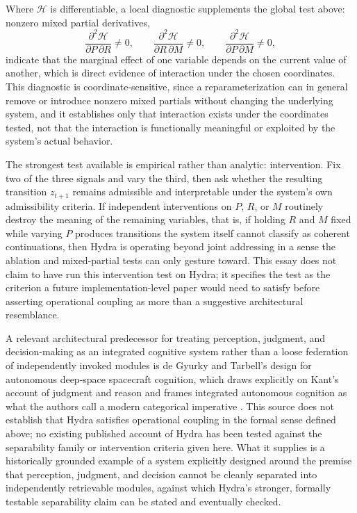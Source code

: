 \documentclass[11pt]{article}
\begin{document}
Where $\mathcal{H}$ is differentiable, a local diagnostic supplements the global test above: nonzero mixed partial derivatives,
\[
\frac{\partial^2 \mathcal{H}}{\partial P\, \partial R} \neq 0, \qquad
\frac{\partial^2 \mathcal{H}}{\partial R\, \partial M} \neq 0, \qquad
\frac{\partial^2 \mathcal{H}}{\partial P\, \partial M} \neq 0,
\]
indicate that the marginal effect of one variable depends on the current value of another, which is direct evidence of interaction under the chosen coordinates. This diagnostic is coordinate-sensitive, since a reparameterization can in general remove or introduce nonzero mixed partials without changing the underlying system, and it establishes only that interaction exists under the coordinates tested, not that the interaction is functionally meaningful or exploited by the system's actual behavior.

The strongest test available is empirical rather than analytic: intervention. Fix two of the three signals and vary the third, then ask whether the resulting transition $z_{t+1}$ remains admissible and interpretable under the system's own admissibility criteria. If independent interventions on $P$, $R$, or $M$ routinely destroy the meaning of the remaining variables, that is, if holding $R$ and $M$ fixed while varying $P$ produces transitions the system itself cannot classify as coherent continuations, then Hydra is operating beyond joint addressing in a sense the ablation and mixed-partial tests can only gesture toward. This essay does not claim to have run this intervention test on Hydra; it specifies the test as the criterion a future implementation-level paper would need to satisfy before asserting operational coupling as more than a suggestive architectural resemblance.

A relevant architectural predecessor for treating perception, judgment, and decision-making as an integrated cognitive system rather than a loose federation of independently invoked modules is de Gyurky and Tarbell's design for autonomous deep-space spacecraft cognition, which draws explicitly on Kant's account of judgment and reason and frames integrated autonomous cognition as what the authors call a modern categorical imperative \cite{degyurky2014}. This source does not establish that Hydra satisfies operational coupling in the formal sense defined above; no existing published account of Hydra has been tested against the separability family or intervention criteria given here. What it supplies is a historically grounded example of a system explicitly designed around the premise that perception, judgment, and decision cannot be cleanly separated into independently retrievable modules, against which Hydra's stronger, formally testable separability claim can be stated and eventually checked.
\end{document}
